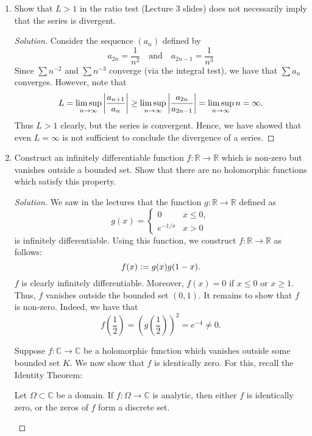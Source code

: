 \documentclass[11pt]{article}
\theoremstyle{definition}
\newenvironment{soln}{\begin{proof}[Solution]}{\end{proof}}
\begin{document}
\begin{enumerate}[leftmargin=*]
    \item Show that $L > 1$ in the ratio test (Lecture $3$ slides) does not necessarily imply that the series is divergent. 
    
    \begin{soln}
    Consider the sequence $(a_n)$ defined by
    \[
        a_{2n} = \frac{1}{n^2} \quad \text{and} \quad a_{2n-1} = \frac{1}{n^3}
    \]
    Since $\sum n^{-2}$ and $\sum n^{-3}$ converge (via the integral test), we have that $\sum a_n$ converges. However, note that
    \[
        L = \limsup_{n \to \infty} \abs{\frac{a_{n+1}}{a_n}} \geq \limsup_{n \to \infty} \abs{\frac{a_{2n}}{a_{2n-1}}} = \limsup_{n \to \infty} n = \infty.
    \]
    Thus $L > 1$ clearly, but the series is convergent. Hence, we have showed that even $L = \infty$ is not sufficient to conclude the divergence of a series. 
    \end{soln}
    
    \item Construct an infinitely differentiable function $f \colon \mathbb{R} \to \mathbb{R}$ which is non-zero but vanishes outside a bounded set. Show that there are no holomorphic functions which satisfy this property. 
    
    \begin{soln}
    We saw in the lectures that the function $g \colon \mathbb{R} \to \mathbb{R}$ defined as
    \[
        g(x) = \begin{cases}
            0 &  x \leq 0, \\
            e^{-1/x} & x > 0
        \end{cases}
    \]
    is infinitely differentiable. Using this function, we construct $f \colon \mathbb{R} \to \mathbb{R}$ as follows:
    \[
        f(x) \vcentcolon= g(x) g(1-x).
    \]
    $f$ is clearly infinitely differentiable. Moreover, $f(x) = 0$ if $x \leq 0$ or $x \geq 1$. Thus, $f$ vanishes outside the bounded set $(0,1)$. It remains to show that $f$ is non-zero. Indeed, we have that
    \[
        f\left( \frac{1}{2} \right) = \left( g\left( \frac{1}{2} \right) \right)^2 = e^{-4} \neq 0.
    \]
    
    \medskip
    
    Suppose $f \colon \mathbb{C} \to \mathbb{C}$ be a holomorphic function which vanishes outside some bounded set $K$. We now show that $f$ is identically zero. For this, recall the Identity Theorem:
    
    \begin{thm*}
    Let $\Omega \subset \mathbb{C}$ be a domain. If $f \colon \Omega \to \mathbb{C}$ is analytic, then either $f$ is identically zero, or the zeros of $f$ form a discrete set.
    \end{thm*}
    

\end{soln}
\end{enumerate}
\end{document}
